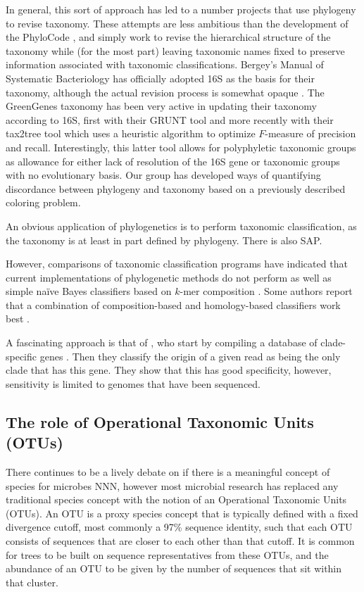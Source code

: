 \documentclass{amsart}
\begin{document}
In general, this sort of approach has led to a number projects that use phylogeny to revise taxonomy.
These attempts are less ambitious than the development of the PhyloCode \citep{forey2001phylocode}, and simply work to revise the hierarchical structure of the taxonomy while (for the most part) leaving taxonomic names fixed to preserve information associated with taxonomic classifications.
Bergey's Manual of Systematic Bacteriology has officially adopted 16S as the basis for their taxonomy, although the actual revision process is somewhat opaque \citep{kreig1984bergey}.
The GreenGenes taxonomy \citep{desantis2006greengenes} has been very active in updating their taxonomy according to 16S, first with their GRUNT tool \citep{dalevi2007automated} and more recently with their tax2tree tool \citep{mcdonald2011improved} which uses a heuristic algorithm to optimize $F$-measure of precision and recall.
Interestingly, this latter tool allows for polyphyletic taxonomic groups as allowance for either lack of resolution of the 16S gene or taxonomic groups with no evolutionary basis.
Our group \citep{matsen2012reconciling} has developed ways of quantifying discordance between phylogeny and taxonomy based on a previously described coloring problem.

An obvious application of phylogenetics is to perform taxonomic classification, as the taxonomy is at least in part defined by phylogeny.
There is also SAP.

However, comparisons of taxonomic classification programs \citep{liu2008accurate,bazinet2012comparative} have indicated that current implementations of phylogenetic methods do not perform as well as simple na\"ive Bayes classifiers based on $k$-mer composition \citep{wang2007naive,rosen2008metagenome}.
Some authors report that a combination of composition-based and homology-based classifiers work best \citep{brady2009phymm,parks2011classifying}.

A fascinating approach is that of \citet{segata2012metagenomic}, who start by compiling a database of clade-specific genes \citep{segata2011metagenomic}.
Then they classify the origin of a given read as being the only clade that has this gene.
They show that this has good specificity, however, sensitivity is limited to genomes that have been sequenced.

\subsection{The role of Operational Taxonomic Units (OTUs)}
There continues to be a lively debate on if there is a meaningful concept of species for microbes NNN, however most microbial research has replaced any traditional species concept with the notion of an Operational Taxonomic Units (OTUs).
An OTU is a proxy species concept that is typically defined with a fixed divergence cutoff, most commonly a 97\% sequence identity, such that each OTU consists of sequences that are closer to each other than that cutoff.
It is common for trees to be built on sequence representatives from these OTUs, and the abundance of an OTU to be given by the number of sequences that sit within that cluster.
\end{document}
